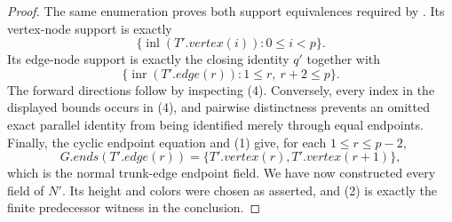 \begin{proof}
The same enumeration proves both support equivalences required by
.  Its vertex-node support is exactly
\[
 \{\operatorname{inl}(T'.vertex(i)):0\leq i<p\}.
\]
Its edge-node support is exactly the closing identity $q'$ together with
\[
 \{\operatorname{inr}(T'.edge(r)):1\leq r,\ r+2\leq p\}.
\]
The forward directions follow by inspecting (4).  Conversely, every
index in the displayed bounds occurs in (4), and pairwise distinctness
prevents an omitted exact parallel identity from being identified merely
through equal endpoints.  Finally, the cyclic endpoint equation and (1)
give, for each $1\leq r\leq p-2$,
\[
 G.ends(T'.edge(r))=
 \{T'.vertex(r),T'.vertex(r+1)\},
\]
which is the normal trunk-edge endpoint field.  We have now constructed
every field of $N'$.  Its height and colors were chosen as asserted, and
(2) is exactly the finite predecessor witness in the conclusion.
\end{proof}
